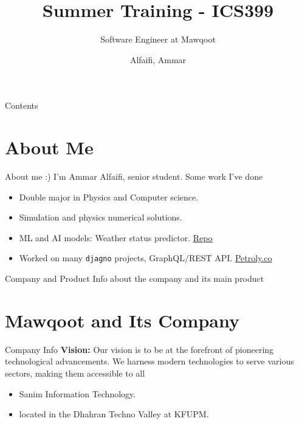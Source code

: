 \documentclass{loyola-beamer}
\title{Summer Training - ICS399}
\subtitle{Software Engineer at Mawqoot}
\author{Alfaifi, Ammar}
\institute{KFUPM}
\begin{document}
\begin{titleframe}{}
	\maketitle
\end{titleframe}

\begin{frame}{Contents}
	\tableofcontents
\end{frame}



\section{About Me}

\begin{frame}{About me :)}
	I'm Ammar Alfaifi, senior student. Some work I've done
	\vspace{\baselineskip}

	\begin{itemize}
		\item Double major in Physics and Computer science.
		\item Simulation and physics numerical solutions.
		\item ML and AI models: Weather status predictor.
		      \href{https://github.com/ammar-faifi/Weather\_Status\_Predictor\_From\_Images}{\underline{Repo}}
		\item Worked on many \texttt{djagno} projects, GraphQL/REST API. \href{https://Petroly.co/}{\underline{Petroly.co}}
	\end{itemize}

\end{frame}

\begin{titleframe}{Company and Product}
	Info about the company and its main product
\end{titleframe}

\section{Mawqoot and Its Company}

\begin{frame}{Company Info}
	\textbf{Vision:} Our vision is to be at the forefront of pioneering technological advancements.
	We harness modern technologies to serve various sectors, making them accessible to all
	\vspace{\baselineskip}

	\begin{itemize}
		\item Sanim Information Technology.
		\item located in the Dhahran Techno Valley at KFUPM.
	\end{itemize}
\end{frame}
\end{document}
